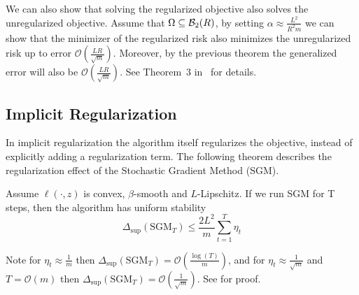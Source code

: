 We can also show that solving the regularized objective also solves the
unregularized objective. Assume that $\Omega \subseteq \mathcal{B}_2(R)$, by
setting $\alpha \approx \frac{L^2}{R^2 m}$ we can show that the minimizer of the
regularized risk also minimizes the unregularized risk up to error
$\mathcal{O}(\frac{LR}{\sqrt{m}})$. Moreover, by the previous theorem the
generalized error will also be $\mathcal{O}(\frac{LR}{\sqrt{m}})$. See Theorem~3
in~\cite{Shalev2010LearnabilitySA} for details.

\subsection{Implicit Regularization}

In implicit regularization the algorithm itself regularizes the objective, instead of explicitly adding a regularization term. The following theorem describes the regularization effect of the Stochastic Gradient Method (SGM). 

\begin{theorem}Assume $\ell(\cdot, z)$ is convex, $\beta$-smooth and $L$-Lipschitz. If we run SGM for T steps, then the algorithm has uniform stability
\begin{equation*}
\Delta_{\sup}(\text{SGM}_T) \leq \frac{2 L^2}{m} \sum_{t=1}^T \eta_t
\end{equation*}
\end{theorem}
Note for $\eta_t \approx \frac{1}{m}$ then $\Delta_{\sup}(\text{SGM}_T) = \mathcal{O}(\frac{\log(T)}{m})$, and for $\eta_t \approx \frac{1}{\sqrt{m}}$ and $T=\mathcal{O}(m)$ then $\Delta_{\sup}(\text{SGM}_T) = \mathcal{O}(\frac{1}{\sqrt{m}} )$. See \cite{HardtRS15} for proof.
